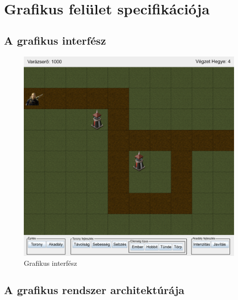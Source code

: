 %
\chapter{Grafikus felület specifikációja}

\thispagestyle{fancy}

\section{A grafikus interfész}

\begin{figure}[H]
\begin{center}
\includegraphics[width=17cm]{chapters/chapter11/images/GraphicPlans.jpg}
\caption{Grafikus interfész}
\label{fig:Grafikus}
\end{center}
\end{figure}

\section{A grafikus rendszer architektúrája}

